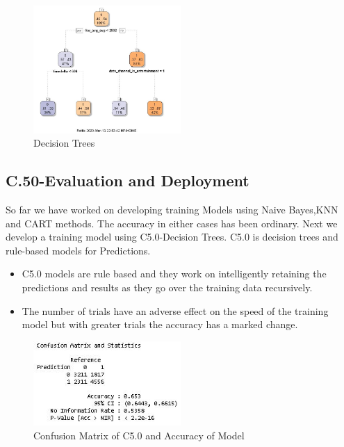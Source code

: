 \documentclass[sigchi]{acmart}
\begin{document}
\begin{figure}[h!]
    \caption{Decision Trees}
    \centering
    \includegraphics[width=0.50\textwidth]{CART_TREE.JPG}
\end{figure}

\subsection{C.50-Evaluation and Deployment}

So far we have worked on developing training Models using Naive Bayes,KNN and CART methods. The accuracy in either cases has been ordinary. Next we develop a training model using C5.0-Decision Trees. C5.0\cite{PackageC50} is decision trees and rule-based models for Predictions.

\begin{itemize}
    \item C5.0 models are rule based and they work on intelligently retaining the predictions and results as they go over the training data recursively.
    \item The number of trials have an adverse effect on the speed of the training model but with greater trials the accuracy has a marked change.
\end{itemize}

\begin{figure}[h!]
    \caption{Confusion Matrix of C5.0 and Accuracy of Model}
    \centering
    \includegraphics[width=0.50\textwidth]{ConfusionMatrixand Accuracy of C5.0.JPG}
\end{figure} 
\end{document}
